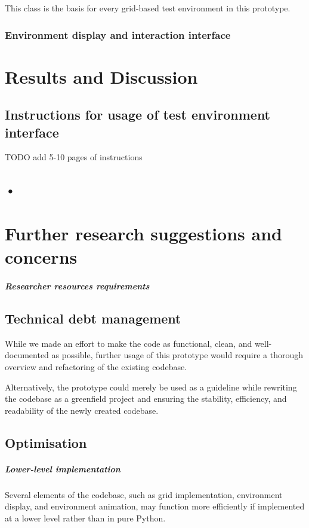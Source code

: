 \documentclass[masterthesis]{fer}
\begin{document}
This class is the basis for every grid-based test environment in this prototype. 
\subsection{Environment display and interaction interface}

\chapter{Results and Discussion}
\label{sec:results_and_discussion}
\section{Instructions for usage of test environment interface}
TODO add 5-10 pages of instructions
\section{•}


\chapter{Further research suggestions and concerns}

\label{sec:further_research_suggestions}
\paragraph{Researcher resources requirements}
\section{Technical debt management}
While we made an effort to make the code as functional, clean, and well-documented as possible,
further usage of this prototype would require a thorough overview and refactoring of the existing codebase.

Alternatively, the prototype could merely be used as a guideline while rewriting the codebase as a greenfield project and ensuring the stability, efficiency, and readability of the newly created codebase.
\section{Optimisation}
\paragraph{Lower-level implementation}
Several elements of the codebase, such as grid implementation, environment display, and environment animation,
may function more efficiently if implemented at a lower level rather than in pure Python.
\end{document}
